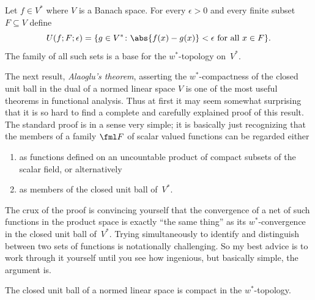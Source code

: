 \begin{prop} Let $f \in V^*$ where $V$ is a Banach space.  For every $\epsilon > 0$ and every
finite subset $F \subseteq V$ define
  \[ U(f;F;\epsilon)
           = \{g \in V^*\colon \abs{f(x) - g(x)} < \epsilon \text{ for all $x \in F$}\}. \]
The family of all such sets is a base for the $w^*$-topology on~$V^*$.
\end{prop}

The next result, \emph{Alaoglu's theorem}, asserting the $w^*$-compactness of the closed unit ball in the
dual of a normed linear space $V$ is one of the most useful theorems in functional analysis.  Thus
at first it may seem somewhat surprising that it is so hard to find a complete and carefully explained
proof of this result.  The standard proof is in a sense very simple; it is basically just recognizing
that the members of a family $\fml F$ of scalar valued functions can be regarded either
  \begin{enumerate}
     \item[(i)] as functions defined on an uncountable product of compact subsets of the scalar field, or alternatively
     \item[(ii)] as members of the closed unit ball of~$V^*$.
  \end{enumerate}
The crux of the proof is convincing yourself that the convergence of a net of such functions in the product space
is exactly ``the same thing'' as its $w^*$-convergence in the closed unit ball of~$V^*$.  Trying simultaneously to
identify and distinguish between two sets of functions is notationally challenging.  So my best advice is to work through
it yourself until you see how ingenious, but basically simple, the argument is.

\begin{thm}\label{C067441} The closed unit ball of a normed linear space is
compact in the $w^*$-topology.
\end{thm}

